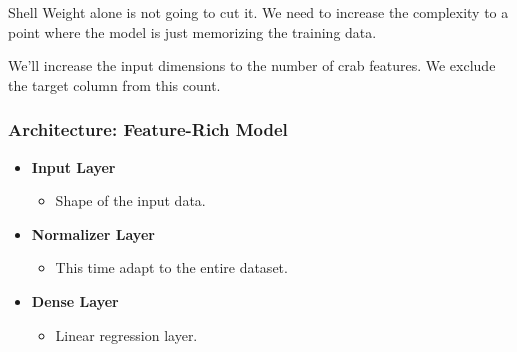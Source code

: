 \documentclass[11pt]{article}
\providecommand{\tightlist}{%
      \setlength{\itemsep}{0pt}\setlength{\parskip}{0pt}}
\begin{document}
Shell Weight alone is not going to cut it. We need to increase the
complexity to a point where the model is just memorizing the training
data.

We'll increase the input dimensions to the number of crab features. We
exclude the target column from this count.

\subsubsection{Architecture: Feature-Rich
Model}\label{architecture-feature-rich-model}

\begin{itemize}
\tightlist
\item
  \textbf{Input Layer}

  \begin{itemize}
  \tightlist
  \item
    Shape of the input data.
  \end{itemize}
\item
  \textbf{Normalizer Layer}

  \begin{itemize}
  \tightlist
  \item
    This time adapt to the entire dataset.
  \end{itemize}
\item
  \textbf{Dense Layer}

  \begin{itemize}
  \tightlist
  \item
    Linear regression layer.
  \end{itemize}
\end{itemize}
\end{document}
